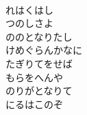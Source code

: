 \documentclass[10pt,b5j]{tarticle} %
\begin{document}
\begin{enumerate}
\begin{minipage}[c]{\blocksize}
        \vspace{\linespace}
        \item~\\
        れはくはし\\
        つのしさよ\\
        ののとなりたし\\
        けめぐらんかなに\\
        たぎりてをせば\\
        もらをへんや\\
        のりがとなりて\\
        にるはこのぞ
    
    \end{minipage}
\end{enumerate} %
\end{document}
